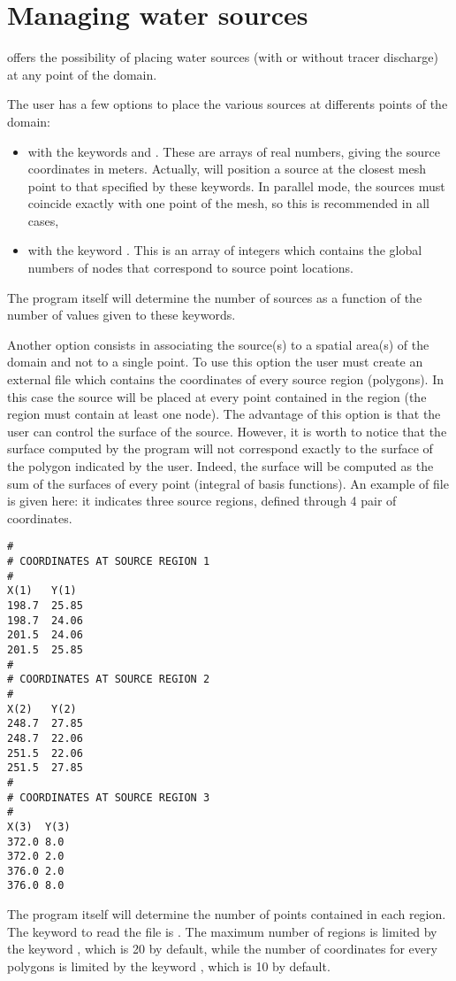 \chapter{Managing water sources}
\label{ch:manag:ws}
 offers the possibility of placing water sources (with or without
tracer discharge) at any point of the domain.

The user has a few options to place the various sources at differents points
of the domain:
\begin{itemize}
\item with the keywords  and
.
These are arrays of real numbers,
giving the source coordinates in meters. Actually,  will position a
source at the closest mesh point to that specified by these keywords.
In parallel mode, the sources must coincide exactly with one point of the mesh,
so this is recommended in all cases,
\item with the keyword . This is an
array of integers which contains the global numbers of nodes that correspond
 to source point locations.
\end{itemize}
The program itself will determine the number of sources as a function of the
number of values given to these keywords.

Another option consists in associating the source(s) to a spatial area(s) of the
domain and not to a single point.
To use this option the user must create an external file which contains the
coordinates of every source region (polygons).
In this case the source will be placed at every point contained in the
region (the region must contain at least one node). The advantage of this option
is that the user can control the surface of the source. However, it is worth to
notice that the surface computed by the program will not correspond exactly to
the surface of the polygon indicated by the user.
Indeed, the surface will be computed as
the sum of the surfaces of every point (integral of basis functions).
An example of file is given here: it indicates three source regions, defined
through 4 pair of coordinates.
\begin{lstlisting}[language=TelemacCas]
#
# COORDINATES AT SOURCE REGION 1
#
X(1)   Y(1)
198.7  25.85
198.7  24.06
201.5  24.06
201.5  25.85
#
# COORDINATES AT SOURCE REGION 2
#
X(2)   Y(2)
248.7  27.85
248.7  22.06
251.5  22.06
251.5  27.85
#
# COORDINATES AT SOURCE REGION 3
#
X(3)  Y(3)
372.0 8.0
372.0 2.0
376.0 2.0
376.0 8.0
\end{lstlisting}
The program itself will determine the number of points contained in each region.
The keyword to read the file is .
The maximum number of regions is limited by the keyword
, which is 20 by default, while the number
of coordinates for every polygons is limited by the keyword
, which is 10 by default.

